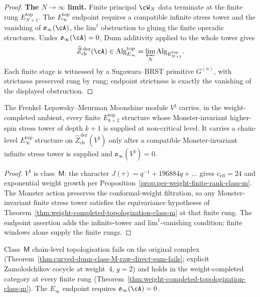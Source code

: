 \begin{proof}
\smallskip\noindent
\textbf{The $N \to \infty$ limit.}
Finite principal $\cW_N$ data terminate at the finite rung
$E_{N+1}^{\mathrm{top}}$. The $E_\infty^{\mathrm{top}}$ endpoint
requires a compatible infinite stress tower and the vanishing of
$\mathfrak{o}_{\infty}(\cA)$, the $\mathrm{lim}^1$ obstruction to
gluing the finite operadic structures. Under
$\mathfrak{o}_{\infty}(\cA) = 0$, Dunn additivity applied to the whole tower
gives
\[
 \widehat{Z}^{\,\mathrm{der}}_{\mathrm{ch}}(\cA)
 \in
 \mathrm{Alg}_{E_\infty}^{\mathrm{top}}
 =
 \varprojlim_N\mathrm{Alg}_{E_{N+1}^{\mathrm{top}}}.
\]
Each finite stage is witnessed by a Sugawara--BRST primitive
$G^{(n)}$, with strictness preserved rung by rung; endpoint strictness
is exactly the vanishing of the displayed obstruction.
\end{proof}

\begin{corollary}
\label{cor:moonshine-chain-level-e-infinity-topological}
\ClaimStatusConditional
The Frenkel--Lepowsky--Meurman Moonshine module $V^{\natural}$
carries, in the weight-completed ambient, every finite
$E_{k+2}^{\mathrm{top}}$ structure whose Monster-invariant
higher-spin stress tower of depth $k+1$ is supplied at non-critical
level. It carries a chain-level $E_\infty^{\mathrm{top}}$ structure
on $\widehat{Z}^{\,\mathrm{der}}_{\mathrm{ch}}(V^{\natural})$ only
after a compatible Monster-invariant infinite stress tower is supplied
and
$\mathfrak{o}_{\infty}(V^{\natural})=0$.
\end{corollary}

\begin{proof}
$V^{\natural}$ is class~$\mathsf{M}$: the character $J(\tau) =
q^{-1} + 196884 q + \ldots$ gives $c_{\mathrm{eff}} = 24$ and
exponential weight growth per
Proposition~\ref{prop:per-weight-finite-rank-class-m}. The Monster
action preserves the conformal-weight filtration, so any
Monster-invariant finite stress tower satisfies the equivariance
hypotheses of
Theorem~\ref{thm:weight-completed-topologization-class-m} at that
finite rung. The endpoint assertion adds the infinite-tower and
$\mathrm{lim}^1$-vanishing condition; finite windows alone supply the
finite rungs.
\end{proof}

\begin{remark}
\label{rem:raw-failure-weight-completed-success}
Class~$\mathsf{M}$ chain-level topologisation fails on the original
complex
(Theorem~\ref{thm:curved-dunn-class-M-raw-direct-sum-fails}; explicit
Zamolodchikov cocycle at weight~$4$, $g=2$) and holds in the
weight-completed category at every finite rung
(Theorem~\ref{thm:weight-completed-topologization-class-m}). The
$E_\infty$ endpoint requires $\mathfrak{o}_{\infty}(\cA)=0$.
\end{remark}

